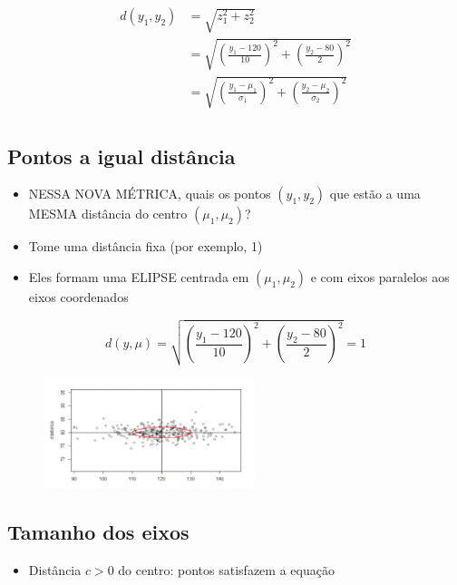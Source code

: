 \documentclass[
  letterpaper,
  DIV=11,
  numbers=noendperiod]{scrartcl}
\providecommand{\tightlist}{%
  \setlength{\itemsep}{0pt}\setlength{\parskip}{0pt}}\usepackage{longtable,booktabs,array}
\begin{document}
\begin{align} 
d(y_1,y_2) &= \sqrt{z_1^2 + z_2^2} \\
&= \sqrt{\left(\frac{y_1-120}{10}\right)^2 + \left(\frac{y_2-80}{2}\right)^2} \\
&= \sqrt{\left(\frac{y_1-\mu_1}{\sigma_1}\right)^2 + \left(\frac{y_2-\mu_2}{\sigma_2}\right)^2} \\
\end{align}

\hypertarget{pontos-a-igual-distuxe2ncia}{%
\subsection{Pontos a igual
distância}\label{pontos-a-igual-distuxe2ncia}}

\begin{itemize}
\tightlist
\item
  NESSA NOVA MÉTRICA, quais os pontos \((y_1, y_2)\) que estão a uma
  MESMA distância do centro \((\mu_1, \mu_2)\)?
\item
  Tome uma distância fixa (por exemplo, 1)
\item
  Eles formam uma ELIPSE centrada em \((\mu_1, \mu_2)\) e com eixos
  paralelos aos eixos coordenados
\end{itemize}

\[ d(y, \mu)  = \sqrt{\left(\frac{y_1-120}{10}\right)^2 + \left(\frac{y_2-80}{2}\right)^2} =1 \]

\begin{figure}

{\centering \includegraphics[width=0.55\textwidth,height=\textheight]{figs/Aula07/elipse.png}

}

\end{figure}

\hypertarget{tamanho-dos-eixos}{%
\subsection{Tamanho dos eixos}\label{tamanho-dos-eixos}}

\begin{itemize}
\tightlist
\item
  Distância \(c>0\) do centro: pontos satisfazem a equação
\end{itemize}
\end{document}
